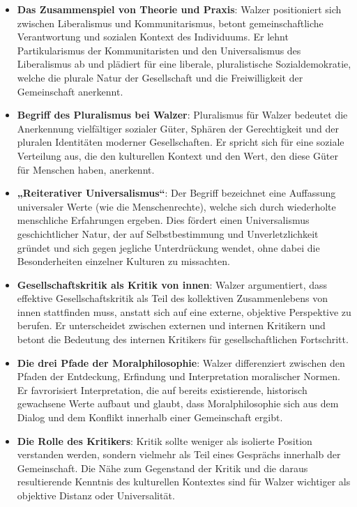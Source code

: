 \documentclass{article}
\begin{document}
\begin{itemize}
	\item \textbf{Das Zusammenspiel von Theorie und Praxis}:
	      Walzer positioniert sich zwischen Liberalismus und Kommunitarismus, betont gemeinschaftliche Verantwortung und sozialen Kontext des Individuums. Er lehnt Partikularismus der Kommunitaristen und den Universalismus des Liberalismus ab und plädiert für eine liberale, pluralistische Sozialdemokratie, welche die plurale Natur der Gesellschaft und die Freiwilligkeit der Gemeinschaft anerkennt.

	\item \textbf{Begriff des Pluralismus bei Walzer}:
	      Pluralismus für Walzer bedeutet die Anerkennung vielfältiger sozialer Güter, Sphären der Gerechtigkeit und der pluralen Identitäten moderner Gesellschaften. Er spricht sich für eine soziale Verteilung aus, die den kulturellen Kontext und den Wert, den diese Güter für Menschen haben, anerkennt.

	\item \textbf{„Reiterativer Universalismus“}:
	      Der Begriff bezeichnet eine Auffassung universaler Werte (wie die Menschenrechte), welche sich durch wiederholte menschliche Erfahrungen ergeben. Dies fördert einen Universalismus geschichtlicher Natur, der auf Selbstbestimmung und Unverletzlichkeit gründet und sich gegen jegliche Unterdrückung wendet, ohne dabei die Besonderheiten einzelner Kulturen zu missachten.

	\item \textbf{Gesellschaftskritik als Kritik von innen}:
	      Walzer argumentiert, dass effektive Gesellschaftskritik als Teil des kollektiven Zusammenlebens von innen stattfinden muss, anstatt sich auf eine externe, objektive Perspektive zu berufen. Er unterscheidet zwischen externen und internen Kritikern und betont die Bedeutung des internen Kritikers für gesellschaftlichen Fortschritt.

	\item \textbf{Die drei Pfade der Moralphilosophie}:
	      Walzer differenziert zwischen den Pfaden der Entdeckung, Erfindung und Interpretation moralischer Normen. Er favrorisiert Interpretation, die auf bereits existierende, historisch gewachsene Werte aufbaut und glaubt, dass Moralphilosophie sich aus dem Dialog und dem Konflikt innerhalb einer Gemeinschaft ergibt.

	\item \textbf{Die Rolle des Kritikers}:
	      Kritik sollte weniger als isolierte Position verstanden werden, sondern vielmehr als Teil eines Gesprächs innerhalb der Gemeinschaft. Die Nähe zum Gegenstand der Kritik und die daraus resultierende Kenntnis des kulturellen Kontextes sind für Walzer wichtiger als objektive Distanz oder Universalität.
\end{itemize}
\newpage
\end{document}
